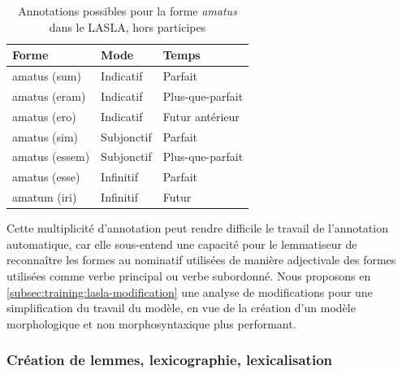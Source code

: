 
\newpara

\begin{table}[h]
\centering
\begin{tabular}{@{}lll@{}}
\toprule
Forme & Mode & Temps \\ \midrule
amatus (sum) & Indicatif & Parfait \\
amatus (eram) & Indicatif & Plus-que-parfait \\
amatus (ero) & Indicatif & Futur antérieur \\
amatus (sim) & Subjonctif & Parfait \\
amatus (essem) & Subjonctif & Plus-que-parfait \\
amatus (esse) & Infinitif & Parfait \\
amatum (iri) & Infinitif & Futur \\ \bottomrule
\end{tabular}
\caption{Annotations possibles pour la forme \textit{amatus} dans le LASLA, hors participes}
\label{table:amatus_forms}
\end{table}

Cette multiplicité d'annotation peut rendre difficile le travail de l'annotation automatique, car elle sous-entend une capacité pour le lemmatiseur de reconnaître les formes au nominatif utilisées de manière adjectivale des formes utilisées comme verbe principal ou verbe subordonné. Nous proposons en \ref{subsec:training:lasla-modification} une analyse de modifications pour une simplification du travail du modèle, en vue de la création d'un modèle morphologique et non morphosyntaxique plus performant.

\subsubsection{Création de lemmes, lexicographie, lexicalisation}

